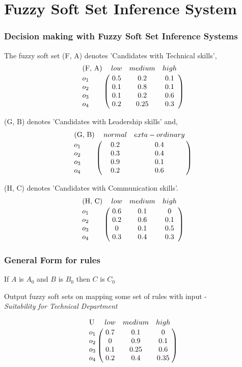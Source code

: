 \documentclass{beamer}
\begin{document}
   \section{Fuzzy Soft Set Inference System}
    \begin{frame}
    \frametitle{Decision making with Fuzzy Soft Set Inference Systems}
    
    The fuzzy soft set (F, A) denotes 'Candidates with Technical skills',\\
  $$\bordermatrix{
  \text{(F, A)} & low & medium & high  \cr
  o_1 & 0.5 & 0.2 & 0.1  \cr
  o_2 &0.1 & 0.8 & 0.1  \cr
  o_3 &0.1 & 0.2 & 0.6  \cr
  o_4 &0.2 & 0.25 & 0.3
  }$$


    \end{frame}
         \begin{frame}
  (G, B) denotes  'Candidates with Leadership skills' and,\\
  $$\bordermatrix{
  \text{(G, B)} & normal & exta-ordinary  \cr
  o_1 & 0.2 & 0.4  \cr
  o_2 &0.3 & 0.4   \cr
  o_3 &0.9 & 0.1   \cr
  o_4 &0.2 & 0.6
  }$$



  (H, C) denotes 'Candidates with Communication skills'.\\
  $$\bordermatrix{
  \text{(H, C)} & low & medium & high  \cr
  o_1 & 0.6 & 0.1 & 0  \cr
  o_2 &0.2 & 0.6 & 0.1  \cr
  o_3 &0 & 0.1 & 0.5  \cr
  o_4 &0.3 & 0.4 & 0.3
  }$$
    
 \end{frame}

 \begin{frame}
 
 \frametitle{General Form for rules}
 \begin{LARGE}
 \begin{center}
 If $A$ is $A_0$ and $B$ is $B_0$ then $C$ is $C_0$
 \end{center}
 \end{LARGE}
 \end{frame}

  \begin{frame}

    Output fuzzy soft sets on mapping some set of rules with input - \\
    \emph{Suitability for Technical Department}
      
  $$\bordermatrix{
  \text{U} & low & medium & high  \cr
  o_1 & 0.7 & 0.1 & 0  \cr
  o_2 &0 & 0.9 & 0.1  \cr
  o_3 &0.1 & 0.25 & 0.6  \cr
  o_4 &0.2 & 0.4 & 0.35
  }$$

  
  \end{frame}
  
\end{document}
